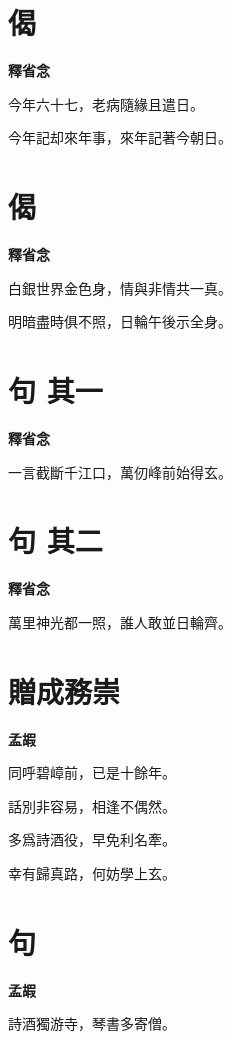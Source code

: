 \documentclass[12pt,a4paper]{ctexbook}
\begin{document}
\section{偈}
\textbf{釋省念}\par\vspace{0.5em}
今年六十七，老病隨緣且遣日。\par
今年記却來年事，來年記著今朝日。\par

\section{偈}
\textbf{釋省念}\par\vspace{0.5em}
白銀世界金色身，情與非情共一真。\par
明暗盡時俱不照，日輪午後示全身。\par

\section{句  其一}
\textbf{釋省念}\par\vspace{0.5em}
一言截斷千江口，萬仞峰前始得玄。\par

\section{句  其二}
\textbf{釋省念}\par\vspace{0.5em}
萬里神光都一照，誰人敢並日輪齊。\par

\section{贈成務崇}
\textbf{孟嘏}\par\vspace{0.5em}
同呼碧嶂前，已是十餘年。\par
話別非容易，相逢不偶然。\par
多爲詩酒役，早免利名牽。\par
幸有歸真路，何妨學上玄。\par

\section{句}
\textbf{孟嘏}\par\vspace{0.5em}
詩酒獨游寺，琴書多寄僧。\par
\end{document}
